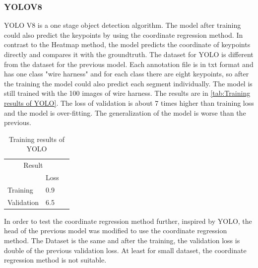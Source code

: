 \subsubsection{YOLOV8}
	YOLO V8 is a one stage object detection algorithm. The model after training could also predict the keypoints by using the coordinate regression method.
	In contrast to the Heatmap method, the model predicts the coordinate of keypoints directly and compares it with the groundtruth. The dataset for YOLO is 
	different from the dataset for the previous model. Each annotation file is in txt format and has one class "wire harness" and for each class there are eight 
	keypoints, so after the training the model could also predict each segment individually. The model is still trained with the 100 images of wire harness.
	The results are in \autoref{tab:Training results of YOLO}. The loss of validation is about 7 times higher than training loss and the model is over-fitting.
	The generalization of the model is worse than the previous. \\
	\begin{table}[htb]
		\centering
		\begin{tabular}{@{}llr@{}} \toprule
		\multicolumn{2}{c}{Result}             \\ \cmidrule(r){1-2}
					& Loss   \\ \midrule
			Training & 0.9    \\
			Validation& 6.5    \\ \bottomrule
		\end{tabular}
		\caption{Training results of YOLO} 
		\label{tab:Training results of YOLO}
		\end{table}
	In order to test the coordinate regression method further, inspired by YOLO, the head of the previous model was modified to use the coordinate regression method.
	The Dataset is the same and after the training, the validation loss is double of the previous validation loss. At least for small dataset, the coordinate regression
	method is not suitable.
